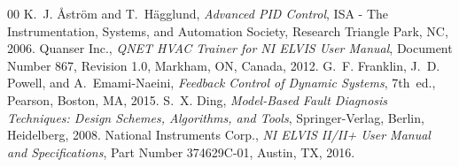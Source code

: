 \documentclass[conference]{IEEEtran}
\begin{document}
\begin{thebibliography}{00}
 K.~J. {\AA}str{\"o}m and T.~H{\"a}gglund, \emph{Advanced PID Control}, ISA - The Instrumentation, Systems, and Automation Society, Research Triangle Park, NC, 2006.
 Quanser Inc., \emph{QNET HVAC Trainer for NI ELVIS User Manual}, Document Number 867, Revision 1.0, Markham, ON, Canada, 2012.
 G.~F. Franklin, J.~D. Powell, and A.~Emami-Naeini, \emph{Feedback Control of Dynamic Systems}, 7th~ed., Pearson, Boston, MA, 2015.
 S.~X. Ding, \emph{Model-Based Fault Diagnosis Techniques: Design Schemes, Algorithms, and Tools}, Springer-Verlag, Berlin, Heidelberg, 2008.
 National Instruments Corp., \emph{NI ELVIS II/II+ User Manual and Specifications}, Part Number 374629C-01, Austin, TX, 2016.
\end{thebibliography}
\end{document}
